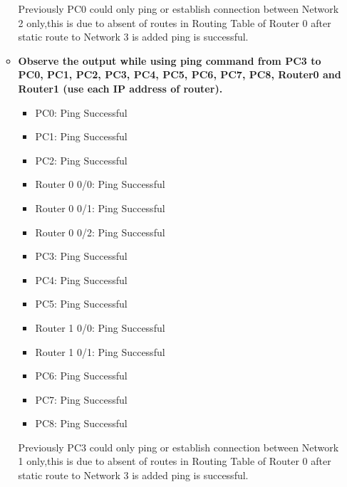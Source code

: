 \documentclass[a4paper,11pt]{article}
\begin{document}
\begin{enumerate}
\begin{itemize}
                        Previously PC0 could only ping or establish connection between Network 2 only,this is due to absent of routes in Routing Table of Router 0 after static route to Network 3 is added ping is successful.

                  \item \textbf{Observe the output while using ping command from PC3 to PC0, PC1, PC2, PC3, PC4, PC5, PC6,
                              PC7, PC8, Router0 and Router1 (use each IP address of router).}
                        \begin{itemize}
                              \item PC0: Ping Successful
                              \item PC1: Ping Successful
                              \item PC2: Ping Successful
                              \item Router 0 0/0: Ping Successful
                              \item Router 0 0/1: Ping Successful
                              \item Router 0 0/2: Ping Successful
                              \item PC3: Ping Successful
                              \item PC4: Ping Successful
                              \item PC5: Ping Successful
                              \item Router 1 0/0: Ping Successful
                              \item Router 1 0/1: Ping Successful
                              \item PC6: Ping Successful
                              \item PC7: Ping Successful
                              \item PC8: Ping Successful
                        \end{itemize}

                        Previously PC3 could only ping or establish connection between Network 1 only,this is due to absent of routes in Routing Table of Router 0 after static route to Network 3 is added ping is successful.


\end{itemize}
\end{enumerate}
\end{document}
